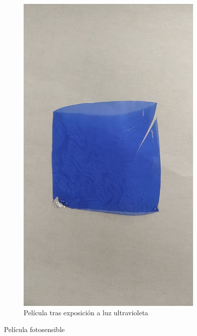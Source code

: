 \begin{figure}[!htb]
\begin{subfigure}[b]{.475\textwidth}
        \includegraphics[width=1\textwidth, trim={0 400 0 400}, clip]{tfg/figuras/06_prototipado/explicacion/pelucula_seca_expuesta.png}
        \caption{Película tras exposición a luz ultravioleta}
        \label{fig:tfg:06:pelicula_insolada}
    \end{subfigure}%
    \caption{Película fotosensible}
    \label{fig:tfg:06:pelucila_fotosensible}
\end{figure}

\pagebreak

